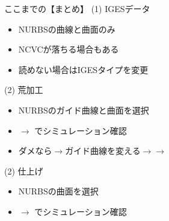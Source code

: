 \newpage
\begin{itembox}[l]{ここまでの【まとめ】}
(1) IGESデータ
\begin{itemize}
\item NURBSの曲線と曲面のみ
\item NCVCが落ちる場合もある
\item 読めない場合はIGESタイプを変更
\end{itemize}
(2) 荒加工
\begin{itemize}
\item NURBSのガイド曲線と曲面を選択
\item {}$\rightarrow$ でシミュレーション確認
\item ダメなら$\rightarrow$ガイド曲線を変える$\rightarrow$$\rightarrow$
\end{itemize}
(2) 仕上げ
\begin{itemize}
\item NURBSの曲面を選択
\item {}$\rightarrow$ でシミュレーション確認
\end{itemize}
\end{itembox}
